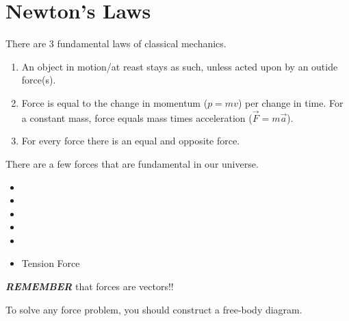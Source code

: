 \section{Newton's Laws}\label{sec:Newtons Laws}
There are 3 fundamental laws of classical mechanics.

\begin{enumerate}
  \item An object in motion/at reast stays as such, unless acted upon by an outide force(s).
  \item Force is equal to the change in momentum ($p=mv$) per change in time. For a constant mass, force equals mass times acceleration ($\vec{F} = m \vec{a}$).
  \item For every force there is an equal and opposite force.
\end{enumerate}
There are a few forces that are fundamental in our universe.

\begin{itemize}[noitemsep, nolistsep]
  \item {}
  \item {}
  \item {}
  \item {}
  \item {}
  \item Tension Force
\end{itemize}

\begin{remark*}
  \textbf{\emph{REMEMBER}} that forces are vectors!!
\end{remark*}

To solve any force problem, you should construct a free-body diagram.

